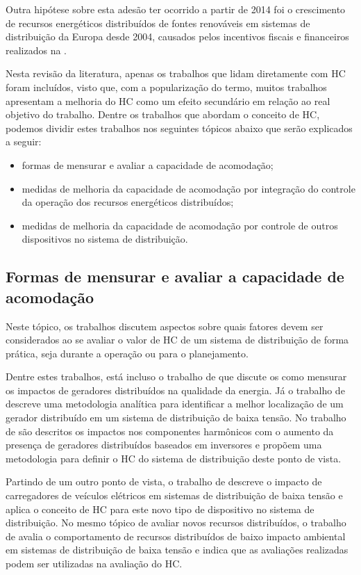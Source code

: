 Outra hipótese sobre esta adesão ter ocorrido a partir de 2014 foi o crescimento de recursos energéticos distribuídos de fontes renováveis em sistemas de distribuição da Europa desde 2004, causados pelos incentivos fiscais e financeiros realizados na .

Nesta revisão da literatura, apenas os trabalhos que lidam diretamente com \ac{HC} foram incluídos, visto que, com a popularização do termo, muitos trabalhos apresentam a melhoria do \ac{HC} como um efeito secundário em relação ao real objetivo do trabalho. Dentre os trabalhos que abordam o conceito de \ac{HC}, podemos dividir estes trabalhos nos seguintes tópicos abaixo que serão explicados a seguir:

\begin{itemize}
    \item formas de mensurar e avaliar a capacidade de acomodação;
    \item medidas de melhoria da capacidade de acomodação por integração do controle da operação dos recursos energéticos distribuídos;
    \item medidas de melhoria da capacidade de acomodação por controle de outros dispositivos no sistema de distribuição.
\end{itemize}
\vfill 

\subsection{Formas de mensurar e avaliar a capacidade de acomodação}

Neste tópico, os trabalhos discutem aspectos sobre quais fatores devem ser considerados ao se avaliar o valor de \ac{HC} de um sistema de distribuição de forma prática, seja durante a operação ou para o planejamento.

Dentre estes trabalhos, está incluso o trabalho de  que discute os como mensurar os impactos de geradores distribuídos na qualidade da energia. Já o trabalho de  descreve uma metodologia analítica para identificar a melhor localização de um gerador distribuído em um sistema de distribuição de baixa tensão. No trabalho de  são descritos os impactos nos componentes harmônicos com o aumento da presença de geradores distribuídos baseados em inversores e propõem uma metodologia para definir o \ac{HC} do sistema de distribuição deste ponto de vista. 

Partindo de um outro ponto de vista, o trabalho de  descreve o impacto de carregadores de veículos elétricos em sistemas de distribuição de baixa tensão e aplica o conceito de \ac{HC} para este novo tipo de dispositivo no sistema de distribuição. No mesmo tópico de avaliar novos recursos distribuídos, o trabalho de  avalia o comportamento de recursos distribuídos de baixo impacto ambiental em sistemas de distribuição de baixa tensão e indica que as avaliações realizadas podem ser utilizadas na avaliação do  \ac{HC}.

